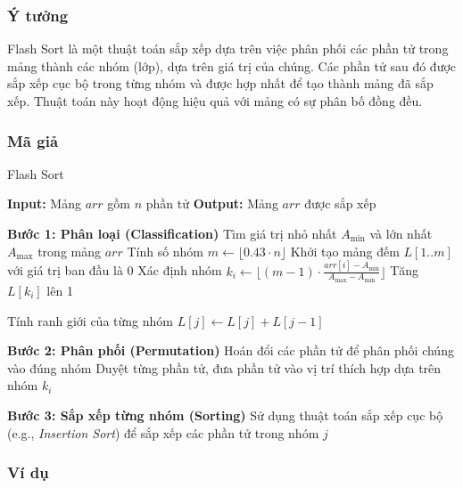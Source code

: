 \subsubsection{Ý tưởng}
Flash Sort là một thuật toán sắp xếp dựa trên việc phân phối các phần tử trong mảng thành các nhóm (lớp), dựa trên giá trị của chúng. Các phần tử sau đó được sắp xếp cục bộ trong từng nhóm và được hợp nhất để tạo thành mảng đã sắp xếp. Thuật toán này hoạt động hiệu quả với mảng có sự phân bố đồng đều.

\subsubsection{Mã giả}

\begin{algorithm}[H]
\caption{Flash Sort}
\begin{algorithmic}[1]
    \State \textbf{Input:} Mảng $arr$ gồm $n$ phần tử
    \State \textbf{Output:} Mảng $arr$ được sắp xếp
    
    \State \textbf{Bước 1: Phân loại (Classification)}
    \State Tìm giá trị nhỏ nhất $A_{\text{min}}$ và lớn nhất $A_{\text{max}}$ trong mảng $arr$
    \State Tính số nhóm $m \gets \lfloor 0.43 \cdot n \rfloor$
    \State Khởi tạo mảng đếm $L[1..m]$ với giá trị ban đầu là 0
        \State Xác định nhóm $k_i \gets \lfloor (m - 1) \cdot \frac{arr[i] - A_{\text{min}}}{A_{\text{max}} - A_{\text{min}}} \rfloor$
        \State Tăng $L[k_i]$ lên 1
    \EndFor
    
    \State Tính ranh giới của từng nhóm
        \State $L[j] \gets L[j] + L[j-1]$
    \EndFor
    
    \State \textbf{Bước 2: Phân phối (Permutation)}
    \State Hoán đổi các phần tử để phân phối chúng vào đúng nhóm
    \State Duyệt từng phần tử, đưa phần tử vào vị trí thích hợp dựa trên nhóm $k_i$
    
    \State \textbf{Bước 3: Sắp xếp từng nhóm (Sorting)}
        \State Sử dụng thuật toán sắp xếp cục bộ (e.g., \textit{Insertion Sort}) để sắp xếp các phần tử trong nhóm $j$
    \EndFor
\EndProcedure
\end{algorithmic}
\end{algorithm}

\subsubsection{Ví dụ}


